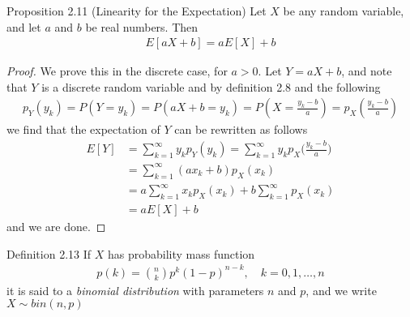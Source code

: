 \begin{boks}{Proposition 2.11 (Linearity for the Expectation)}
Let $X$ be any random variable, and let $a$ and $b$ be real numbers. Then
\begin{align*}
    E[aX + b] = aE[X] + b
\end{align*}
\end{boks}

\begin{proof}
We prove this in the discrete case, for $a > 0$. Let $Y = aX + b$, and note that $Y$ is a discrete random variable and by definition 2.8 and the following
\begin{align*}
  p_Y(y_k) =
  P(Y = y_k) =
  P(aX + b = y_k) =
  P\left( X = \frac{y_k - b}{a} \right) =
  p_X\left( \frac{y_k - b}{a} \right)
\end{align*}
we find that the expectation of $Y$ can be rewritten as follows
\begin{align*}
    E[Y] &= \sum_{k=1}^\infty y_kp_Y(y_k) = \sum_{k=1}^\infty y_kp_X\bigg(\frac{y_k - b}{a}\bigg)\\
    &= \sum_{k=1}^\infty (ax_k + b) p_X(x_k) \\
    &= a\sum_{k=1}^\infty x_kp_X(x_k) + b \sum_{k=1}^\infty p_X(x_k)\\
    &= aE[X] + b
\end{align*}
and we are done.
\end{proof}

\begin{boks}{Definition 2.13}
  If $X$ has probability mass function
  \begin{align*}
    p(k) = \binom{n}{k} p^k (1 - p)^{n - k}, \quad k = 0, 1, \ldots, n
  \end{align*}
  it is said to a \textit{binomial distribution} with parameters $n$ and $p$, and we write $X \sim bin(n,p)$
\end{boks}

